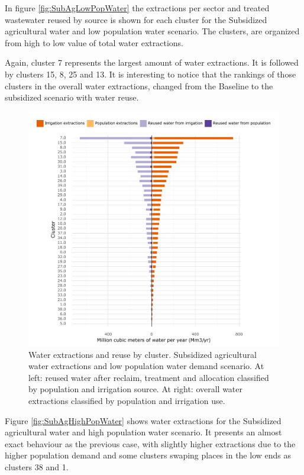 \documentclass[12pt]{iopart}
\begin{document}
In figure \autoref{fig:SubAgLowPopWater} the extractions per sector and treated wastewater reused by source is shown for each cluster for the Subsidized agricultural water and low population water scenario. The clusters, are organized from high to low value of total water extractions.

Again, cluster 7 represents the largest amount of water extractions. It is followed by clusters 15, 8, 25 and 13. It is interesting to notice that the rankings of those clusters in the overall water extractions, changed from the Baseline to the subsidized scenario with water reuse.

\begin{figure}[!h]
	\centering
	\includegraphics[width=\textwidth]{Sub_agri_water_Low_pop_water}
	\caption{Water extractions and reuse by cluster. Subsidized agricultural water extractions and low population water demand scenario. At left: reused water after reclaim, treatment and allocation classified by population and irrigation source. At right: overall water extractions classified by population and irrigation use.}
	\label{fig:SubAgLowPopWater}
\end{figure}
\newpage

Figure \autoref{fig:SubAgHighPopWater} shows water extractions for the Subsidized agricultural water and high population water scenario. It presents an almost exact behaviour as the previous case, with slightly higher extractions due to the higher population demand and some clusters swaping places in the low ends as clusters 38 and 1.
\end{document}
